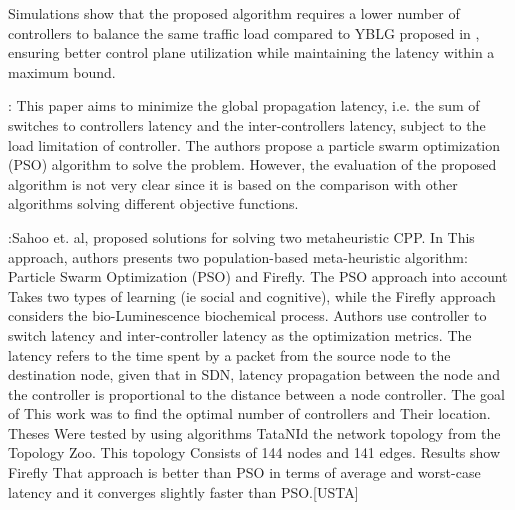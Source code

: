 \documentclass[a4paper,10pt]{article}
\begin{document}
Simulations show that the proposed algorithm requires a lower number of controllers to balance the same traffic load compared to YBLG proposed in \cite{YaBi14}, ensuring better control plane utilization while maintaining the latency within a maximum bound. 

\cite{GaWa15}: This paper aims to minimize the global propagation latency, i.e. the sum of switches to controllers latency and the inter-controllers latency, subject to the load limitation of controller. The authors propose a particle swarm optimization (PSO) algorithm to solve the problem. However, the evaluation of the proposed algorithm is not very clear since it is based on the comparison with other algorithms solving different objective functions. 



\cite{SaSa17}:Sahoo et. al, proposed solutions for solving two metaheuristic CPP. In This approach, authors presents two population-based meta-heuristic algorithm: Particle Swarm Optimization (PSO) and Firefly. The PSO approach into account Takes two types of learning (ie social and cognitive), while the Firefly approach considers the bio-Luminescence biochemical process. Authors use controller to switch latency and inter-controller latency as the optimization metrics. The latency refers to the time spent by a packet from the source node to the destination node, given that in SDN, latency propagation between the node and the controller is proportional to the distance between a node controller. The goal of This work was to find the optimal number of controllers and Their location. Theses Were tested by using algorithms TataNId the network topology from the Topology Zoo. This topology Consists of 144 nodes and 141 edges. Results show Firefly That approach is better than PSO in terms of average and worst-case latency and it converges slightly faster than PSO.[USTA]
\end{document}
